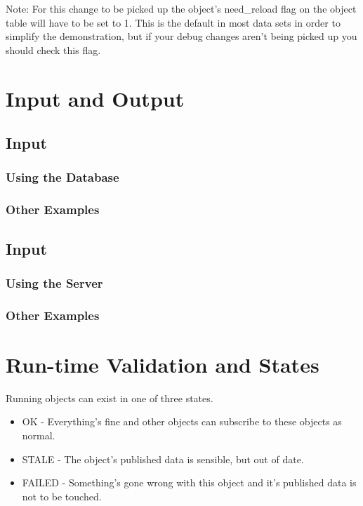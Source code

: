 \documentclass{report}
\begin{document}
Note: For this change to be picked up the object's need_reload flag on the object table will have to be set to 1. This is the default in most data sets in order to simplify the demonstration, but if your debug changes aren't being picked up you should check this flag.

\section{Input and Output}

\subsection{Input}

\subsubsection{Using the Database}

\subsubsection{Other Examples}

\subsection{Input}

\subsubsection{Using the Server}

\subsubsection{Other Examples}

\section{Run-time Validation and States}

Running objects can exist in one of three states.

\begin{itemize}
\item OK - Everything's fine and other objects can subscribe to these objects as normal.
\item STALE - The object's published data is sensible, but out of date. 
\item FAILED - Something's gone wrong with this object and it's published data is not to be touched.
\end{itemize}
\end{document}
